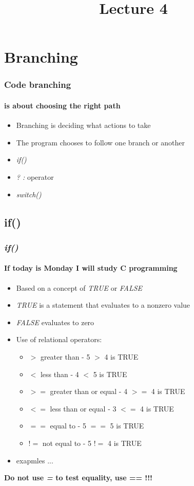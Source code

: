 \documentclass[10pt]{beamer}
\title{Lecture 4}
\date{}
\begin{document}
\frame{
    \titlepage
}

%
%
%
%
%
\section{Branching}

\begin{frame}
\frametitle{Code branching}
\framesubtitle{is about choosing the right path}
  \begin{itemize}
    \item Branching is deciding what actions to take
    \item The program chooses to follow one branch or another
    \item \textit{if()}
    \item \textit{? :} operator
    \item \textit{switch() {}}
  \end{itemize}
\end{frame}

\subsection{if()}

\begin{frame}
  \frametitle{\textit{if()}}
  \framesubtitle{If today is Monday I will study C programming}
  
  \begin{itemize}
    \item Based on a concept of \textit{TRUE} or \textit{FALSE}
    \item \textit{TRUE} is a statement that evaluates to a nonzero value
    \item \textit{FALSE} evaluates to zero
    \item Use of relational operators:
    \begin{itemize}
      \item $>$     greater than       -       5 $>$ 4 is TRUE
      \item $<$     less than           -      4 $<$ 5 is TRUE
      \item $>=$    greater than or equal -    4 $>=$ 4 is TRUE
      \item $<=$    less than or equal      -  3 $<=$ 4 is TRUE
      \item $==$    equal to               -   5 $==$ 5 is TRUE
      \item $!=$    not equal to            -  5 $!=$ 4 is TRUE
    \end{itemize}
    \item exapmles ...
  \end{itemize}
  \centering
  {\bf \color{red} \Large Do not use \textit{=} to test equality, use == !!!} 
\end{frame}
\end{document}
